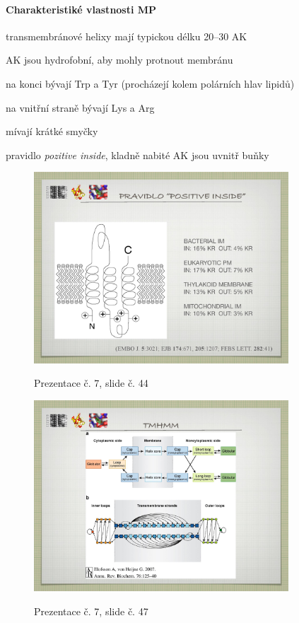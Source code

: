 \documentclass[DIV=8]{scrreprt}
\begin{document}
\paragraph{Charakteristiké vlastnosti MP}
\begin{myItemize}[nosep]
    \item transmembránové helixy mají typickou délku 20--30 AK
    \item AK jsou hydrofobní, aby mohly protnout membránu
\begin{myItemize}[nosep]
    \item na konci bývají Trp a Tyr (procházejí kolem polárních hlav lipidů)
    \item na vnitřní straně bývají Lys a Arg
\end{myItemize}

    \item mívají krátké smyčky
    \item pravidlo \emph{pozitive inside}, kladně nabité AK jsou uvnitř buňky \begin{figure}
    \caption{Prezentace č. 7, slide č. 44}
    \includegraphics[width=0.85\textwidth]{slides-7/slide-44.jpg}
    \centering
    \label{slides-7-slide-44}
\end{figure}

\end{myItemize}



\begin{figure}
    \caption{Prezentace č. 7, slide č. 47}
    \includegraphics[width=0.85\textwidth]{slides-7/slide-47.jpg}
    \centering
    \label{slides-7-slide-47}
\end{figure}
\end{document}
